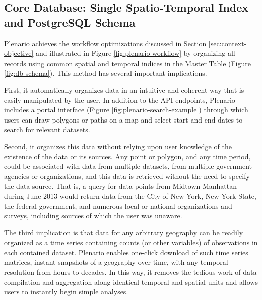 \documentclass[11pt]{article}
\begin{document}
\subsection{\textbf{Core Database: Single Spatio-Temporal Index and PostgreSQL Schema}}\label{sec:core-database}
Plenario achieves the workflow optimizations discussed in Section \ref{sec:context-objective} and illustrated in Figure \ref{fig:plenario-workflow} by organizing all records using common spatial and temporal indices in the Master Table (Figure \ref{fig:db-schema}). This method has several important implications. 

First, it automatically organizes data in an intuitive and coherent way that is easily manipulated by the user. In addition to the API endpoints, Plenario includes a portal interface (Figure \ref{fig:plenario-search-example}) through which users can draw polygons or paths on a map and select start and end dates to search for relevant datasets. 

Second, it organizes this data without relying upon user knowledge of the existence of the data or its sources. Any point or polygon, and any time period, could be associated with data from multiple datasets, from multiple government agencies or organizations, and this data is retrieved without the need to specify the data source. That is, a query for data points from Midtown Manhattan during June 2013 would return data from the City of New York, New York State, the federal government, and numerous local or national organizations and surveys, including sources of which the user was unaware. 

The third implication is that data for any arbitrary geography can be readily organized as a time series containing counts (or other variables) of observations in each contained dataset. Plenario enables one-click download of such time series matrices, instant snapshots of a geography over time, with any temporal resolution from hours to decades. In this way, it removes the tedious work of data compilation and aggregation along identical temporal and spatial units and allows users to instantly begin simple analyses.
\end{document}
